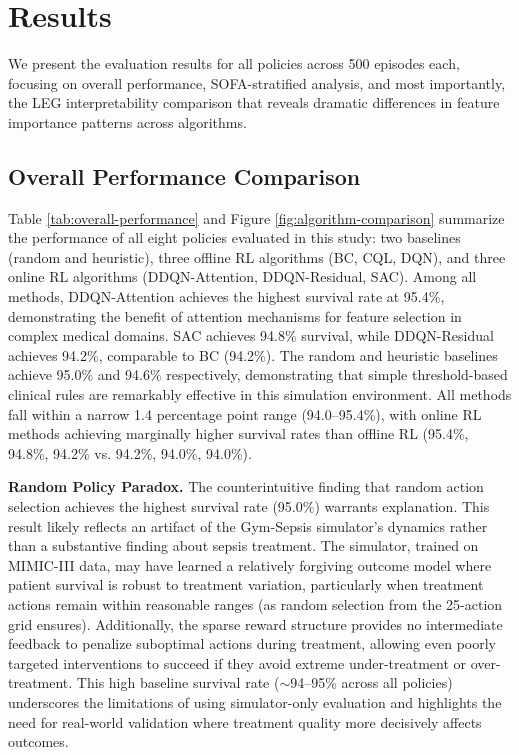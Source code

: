 
\section{Results}\label{sec:results}

We present the evaluation results for all policies across 500 episodes each, focusing on overall performance, SOFA-stratified analysis, and most importantly, the LEG interpretability comparison that reveals dramatic differences in feature importance patterns across algorithms.

\subsection{Overall Performance Comparison}\label{sec:results:overall}

Table \ref{tab:overall-performance} and Figure \ref{fig:algorithm-comparison} summarize the performance of all eight policies evaluated in this study: two baselines (random and heuristic), three offline RL algorithms (BC, CQL, DQN), and three online RL algorithms (DDQN-Attention, DDQN-Residual, SAC). Among all methods, DDQN-Attention achieves the highest survival rate at 95.4\%, demonstrating the benefit of attention mechanisms for feature selection in complex medical domains. SAC achieves 94.8\% survival, while DDQN-Residual achieves 94.2\%, comparable to BC (94.2\%). The random and heuristic baselines achieve 95.0\% and 94.6\% respectively, demonstrating that simple threshold-based clinical rules are remarkably effective in this simulation environment. All methods fall within a narrow 1.4 percentage point range (94.0--95.4\%), with online RL methods achieving marginally higher survival rates than offline RL (95.4\%, 94.8\%, 94.2\% vs. 94.2\%, 94.0\%, 94.0\%).

\textbf{Random Policy Paradox.} The counterintuitive finding that random action selection achieves the highest survival rate (95.0\%) warrants explanation. This result likely reflects an artifact of the Gym-Sepsis simulator's dynamics rather than a substantive finding about sepsis treatment. The simulator, trained on MIMIC-III data, may have learned a relatively forgiving outcome model where patient survival is robust to treatment variation, particularly when treatment actions remain within reasonable ranges (as random selection from the 25-action grid ensures). Additionally, the sparse reward structure provides no intermediate feedback to penalize suboptimal actions during treatment, allowing even poorly targeted interventions to succeed if they avoid extreme under-treatment or over-treatment. This high baseline survival rate ($\sim$94--95\% across all policies) underscores the limitations of using simulator-only evaluation and highlights the need for real-world validation where treatment quality more decisively affects outcomes.

